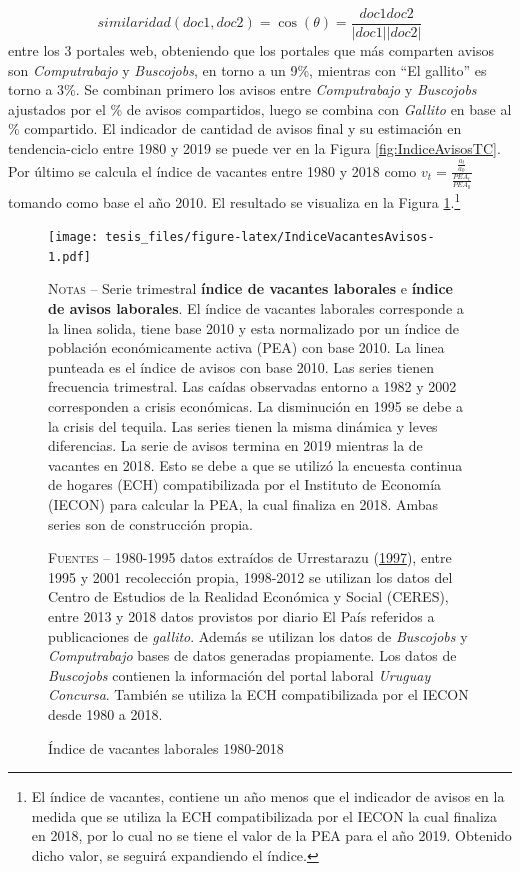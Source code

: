 \documentclass[12pt,oneside]{reedthesis}
\begin{document}
\[
similaridad(doc1, doc2) = \cos(\theta) = \frac{doc1doc2}{|doc1||doc2|}
\]
entre los 3 portales web, obteniendo que los portales que más comparten avisos son \emph{Computrabajo} y \emph{Buscojobs}, en torno a un 9\%, mientras con ``El gallito'' es torno a 3\%. Se combinan primero los avisos entre \emph{Computrabajo} y \emph{Buscojobs} ajustados por el \% de avisos compartidos, luego se combina con \emph{Gallito} en base al \% compartido. El indicador de cantidad de avisos final y su estimación en tendencia-ciclo entre 1980 y 2019 se puede ver en la Figura \ref{fig:IndiceAvisosTC}. Por último se calcula el índice de vacantes entre 1980 y 2018 como \(v_t=\frac{\frac{a_t}{a_0}}{\frac{PEA_t}{PEA_0}}\) tomando como base el año 2010. El resultado se visualiza en la Figura \ref{fig:IndiceVacantesAvisos}.\footnote{El índice de vacantes, contiene un año menos que el indicador de avisos en la medida que se utiliza la ECH compatibilizada por el IECON la cual finaliza en 2018, por lo cual no se tiene el valor de la PEA para el año 2019. Obtenido dicho valor, se seguirá expandiendo el índice.}
\begin{figure}
\texttt{[image: tesis\_files/figure-latex/IndiceVacantesAvisos-1.pdf]}
\caption{Índice de vacantes laborales 1980-2018}\label{fig:IndiceVacantesAvisos}\textsc{}

\footnotesize\textsc{Notas} -- Serie trimestral \textbf{índice de vacantes laborales} e \textbf{índice de avisos laborales}. El índice de vacantes laborales corresponde a la linea solida, tiene base 2010 y esta normalizado por un índice de  población económicamente activa (PEA) con base 2010. La linea punteada es el índice de avisos con base 2010. Las series tienen frecuencia trimestral. Las caídas observadas entorno a 1982 y 2002 corresponden a crisis económicas. La disminución en 1995 se debe a la crisis del tequila. Las series tienen la misma dinámica y leves diferencias. La serie de avisos termina en 2019 mientras la de vacantes en 2018. Esto se debe a que se utilizó la encuesta continua de hogares (ECH) compatibilizada por el Instituto de Economía (IECON) para calcular la PEA, la cual finaliza en 2018. Ambas series son de construcción propia.

\textsc{Fuentes} -- 1980-1995 datos extraídos de Urrestarazu (\protect\hyperlink{ref-Urrestarazu1997}{1997}), entre 1995 y 2001 recolección propia, 1998-2012 se utilizan los datos del Centro de Estudios de la Realidad Económica y Social (CERES), entre 2013 y 2018 datos provistos por diario El País referidos a publicaciones de \textit{gallito}. Además se utilizan los datos de \textit{Buscojobs} y \textit{Computrabajo} bases de datos generadas propiamente. Los datos de \textit{Buscojobs} contienen la información del portal laboral \textit{Uruguay Concursa}. También se utiliza la ECH compatibilizada por el IECON desde 1980 a 2018.
\end{figure}
\end{document}
